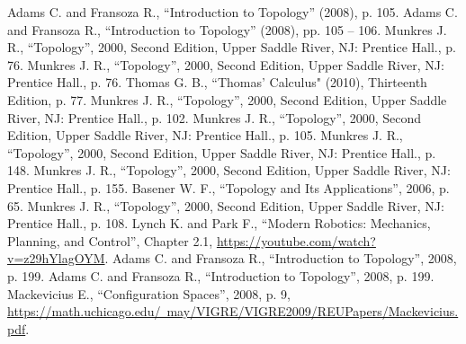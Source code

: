 \documentclass[12pt]{article}
\theoremstyle{definition}
\begin{document}
\begin{center}
\begin{thebibliography}{00}
     Adams C. and Fransoza R., ``Introduction to Topology'' (2008), p. 105.
     Adams C. and Fransoza R., ``Introduction to Topology'' (2008), pp. 105 -- 106.
     Munkres J. R., ``Topology'', 2000, Second Edition, Upper Saddle River, NJ: Prentice Hall., p. 76.
     Munkres J. R., ``Topology'', 2000, Second Edition, Upper Saddle River, NJ: Prentice Hall., p. 76.
     Thomas G. B., ``Thomas' Calculus" (2010), Thirteenth Edition, p. 77.
     Munkres J. R., ``Topology'', 2000, Second Edition, Upper Saddle River, NJ: Prentice Hall., p. 102.
     Munkres J. R., ``Topology'', 2000, Second Edition, Upper Saddle River, NJ: Prentice Hall., p. 105.
     Munkres J. R., ``Topology'', 2000, Second Edition, Upper Saddle River, NJ: Prentice Hall., p. 148.
     Munkres J. R., ``Topology'', 2000, Second Edition, Upper Saddle River, NJ: Prentice Hall., p. 155.
     Basener W. F., ``Topology and Its Applications'', 2006, p. 65.
     Munkres J. R., ``Topology'', 2000, Second Edition, Upper Saddle River, NJ: Prentice Hall., p. 108.
     Lynch K. and Park F., ``Modern Robotics: Mechanics, Planning, and Control'', Chapter 2.1, \href{https://youtube.com/watch?v=z29hYlagOYM}{https://youtube.com/watch?v=z29hYlagOYM}.
     Adams C. and Fransoza R., ``Introduction to Topology'', 2008, p. 199.
     Adams C. and Fransoza R., ``Introduction to Topology'', 2008, p. 199.
     Mackevicius E., ``Configuration Spaces'', 2008, p. 9,\\\href{https://math.uchicago.edu/~may/VIGRE/VIGRE2009/REUPapers/Mackevicius.pdf}{https://math.uchicago.edu/~may/VIGRE/VIGRE2009/REUPapers/Mackevicius.pdf}.
\end{thebibliography}
\end{center}
\end{document}
